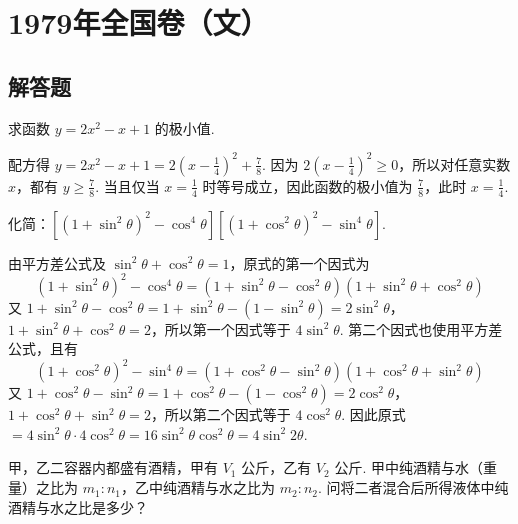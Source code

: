 \chapter{1979年全国卷（文）}
\section{解答题}

\begin{problem}
求函数 \(y = 2x^{2} - x + 1\) 的极小值.
\end{problem}

\begin{solution}
配方得 \(y=2x^{2}-x+1=2\left(x-\frac{1}{4}\right)^{2}+\frac{7}{8}\). 因为 \(2\left(x-\frac{1}{4}\right)^{2}\geqslant0\)，所以对任意实数 \(x\)，都有 \(y\geqslant\frac{7}{8}\). 当且仅当 \(x=\frac{1}{4}\) 时等号成立，因此函数的极小值为 \(\frac{7}{8}\)，此时 \(x=\frac{1}{4}\).
\end{solution}

\begin{problem}
化简：\(\left[(1 + \sin^2\theta)^2 - \cos^4\theta\right]\left[(1 + \cos^2\theta)^2 - \sin^4\theta\right]\).
\end{problem}

\begin{solution}
由平方差公式及 \(\sin^2\theta+\cos^2\theta=1\)，原式的第一个因式为
\[
(1+\sin^2\theta)^2-\cos^4\theta=(1+\sin^2\theta-\cos^2\theta)(1+\sin^2\theta+\cos^2\theta)
\]
又 \(1+\sin^2\theta-\cos^2\theta=1+\sin^2\theta-(1-\sin^2\theta)=2\sin^2\theta\)，\(1+\sin^2\theta+\cos^2\theta=2\)，所以第一个因式等于 \(4\sin^2\theta\). 第二个因式也使用平方差公式，且有
\[
(1+\cos^2\theta)^2-\sin^4\theta=(1+\cos^2\theta-\sin^2\theta)(1+\cos^2\theta+\sin^2\theta)
\]
又 \(1+\cos^2\theta-\sin^2\theta=1+\cos^2\theta-(1-\cos^2\theta)=2\cos^2\theta\)，\(1+\cos^2\theta+\sin^2\theta=2\)，所以第二个因式等于 \(4\cos^2\theta\).
因此原式 \(=4\sin^2\theta\cdot4\cos^2\theta=16\sin^2\theta\cos^2\theta=4\sin^2 2\theta\).
\end{solution}

\begin{problem}
甲，乙二容器内都盛有酒精，甲有 \(V_{1}\text{ 公斤}\)，乙有 \(V_{2}\text{ 公斤}\). 甲中纯酒精与水（重量）之比为 \(m_{1}:n_{1}\)，乙中纯酒精与水之比为 \(m_{2}:n_{2}\). 问将二者混合后所得液体中纯酒精与水之比是多少？
\end{problem}

